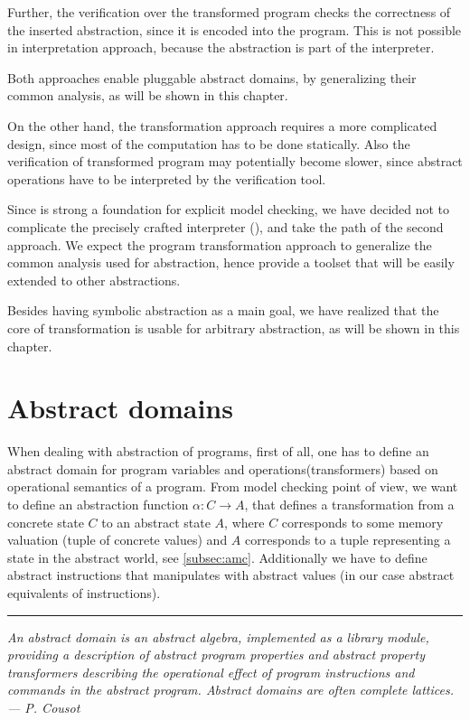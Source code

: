 Further, the verification over the transformed program checks the correctness of
the inserted abstraction, since it is encoded into the program. This is not
possible in interpretation approach, because the abstraction is part of the
interpreter.

Both approaches enable pluggable abstract domains, by generalizing their
common analysis, as will be shown in this chapter.

On the other hand, the transformation approach requires a more complicated
design, since most of the computation has to be done statically. Also the
verification of transformed program may potentially become slower, since
abstract operations have to be interpreted by the verification tool.

Since \DIVINE is strong a foundation for explicit model checking, we have
decided not to complicate the precisely crafted interpreter (\DIVM), and take
the path of the second approach. We expect the program transformation approach
to generalize the common analysis used for abstraction, hence provide a
toolset that will be easily extended to other abstractions.

Besides having symbolic abstraction as a main goal, we have realized that the
core of transformation is usable for arbitrary abstraction, as will be shown in
this chapter.

\section{Abstract domains} \label{sec:absdom}

When dealing with abstraction of programs, first of all, one has to define an
abstract domain for program variables and operations(transformers) based on
operational semantics of a program. From model checking point of view, we want
to define an abstraction function $\alpha \colon C \to A$, that defines a
transformation from a concrete state $C$ to an abstract state $A$, where $C$
corresponds to some memory valuation (tuple of concrete values) and $A$
corresponds to a tuple representing a state in the abstract world, see
\autoref{subsec:amc}. Additionally we have to define abstract instructions that
manipulates with abstract values (in our case abstract equivalents of \LLVM
instructions).

\bigskip

\hrule

\bigskip
\noindent
\textit{An abstract domain is an abstract algebra, implemented as a library module,
providing a description of abstract program properties and abstract property
transformers describing the operational effect of program instructions and
commands in the abstract program. Abstract domains are often complete lattices.
--- P. Cousot \cite{Cousot79} }
\bigskip

